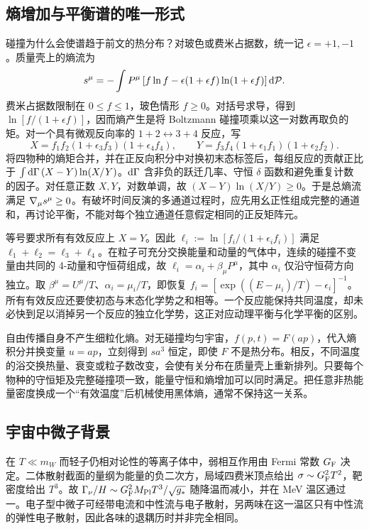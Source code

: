 \subsection{熵增加与平衡谱的唯一形式}

碰撞为什么会使谱趋于前文的热分布？对玻色或费米占据数，统一记 $\epsilon=+1,-1$。质量壳上的熵流为
\[
 s^\mu=-\int P^\mu
 \left[f\ln f-\epsilon(1+\epsilon f)\ln(1+\epsilon f)\right]\dd\mathcal P .
\]
费米占据数限制在 $0\leq f\leq1$，玻色情形 $f\geq0$。对括号求导，得到 $\ln[f/(1+\epsilon f)]$，因而熵产生是将 Boltzmann 碰撞项乘以这一对数再取负的矩。对一个具有微观反向率的 $1+2\leftrightarrow3+4$ 反应，写
\[
 X=f_1f_2(1+\epsilon_3 f_3)(1+\epsilon_4 f_4),\qquad
 Y=f_3f_4(1+\epsilon_1 f_1)(1+\epsilon_2 f_2).
\]
将四物种的熵矩合并，并在正反向积分中对换初末态标签后，每组反应的贡献正比于 $\int \dd\Gamma\,(X-Y)\ln(X/Y)$。$\dd\Gamma$ 含非负的跃迁几率、守恒 $\delta$ 函数和避免重复计数的因子。对任意正数 $X,Y$，对数单调，故 $(X-Y)\ln(X/Y)\geq0$。于是总熵流满足 $\nabla_\mu s^\mu\geq0$。有破坏时间反演的多通道过程时，应先用幺正性组成完整的通道和，再讨论平衡，不能对每个独立通道任意假定相同的正反矩阵元。

等号要求所有有效反应上 $X=Y$。因此 $\ell_i:=\ln[f_i/(1+\epsilon_i f_i)]$ 满足 $\ell_1+\ell_2=\ell_3+\ell_4$。在粒子可充分交换能量和动量的气体中，连续的碰撞不变量由共同的 4-动量和守恒荷组成，故 $\ell_i=\alpha_i+\beta_\mu P^\mu$，其中 $\alpha_i$ 仅沿守恒荷方向独立。取 $\beta^\mu=U^\mu/T$、$\alpha_i=\mu_i/T$，即恢复 $f_i=[\exp((E-\mu_i)/T)-\epsilon_i]^{-1}$。所有有效反应还要使初态与末态化学势之和相等。一个反应能保持共同温度，却未必快到足以消掉另一个反应的独立化学势，这正对应动理平衡与化学平衡的区别。

自由传播自身不产生细粒化熵。对无碰撞均匀宇宙，$f(p,t)=F(ap)$，代入熵积分并换变量 $u=ap$，立刻得到 $s a^3$ 恒定，即使 $F$ 不是热分布。相反，不同温度的浴交换热量、衰变或粒子数改变，会使有关分布在质量壳上重新排列。只要每个物种的守恒矩及完整碰撞项一致，能量守恒和熵增加可以同时满足。把任意非热能量密度换成一个“有效温度”后机械使用黑体熵，通常不保持这一关系。

\subsection{宇宙中微子背景}

在 $T\ll m_W$ 而轻子仍相对论性的等离子体中，弱相互作用由 Fermi 常数 $G_{\rm F}$ 决定。二体散射截面的量纲为能量的负二次方，局域四费米顶点给出 $\sigma\sim G_{\rm F}^2 T^2$，靶密度给出 $T^3$。故 $\Gamma_\nu/H\sim G_{\rm F}^2M_{\rm Pl}T^3/\sqrt{g_*}$ 随降温而减小，并在 MeV 温区通过一。电子型中微子可经带电流和中性流与电子散射，另两味在这一温区只有中性流的弹性电子散射，因此各味的退耦历时并非完全相同。

